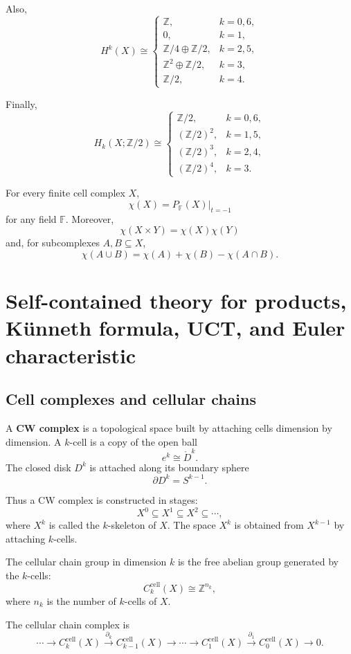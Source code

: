 \documentclass[12pt,a4paper]{article}
\theoremstyle{notespace}
\begin{document}
Also,
\[
\boxed{
	H^k(X)\cong
	\begin{cases}
		\mathbb Z, & k=0,6,\\[1mm]
		0, & k=1,\\[1mm]
		\mathbb Z/4\oplus \mathbb Z/2, & k=2,5,\\[1mm]
		\mathbb Z^2\oplus \mathbb Z/2, & k=3,\\[1mm]
		\mathbb Z/2, & k=4.
\end{cases}}
\]

Finally,
\[
\boxed{
	H_k(X;\mathbb Z/2)\cong
	\begin{cases}
		\mathbb Z/2, & k=0,6,\\[1mm]
		(\mathbb Z/2)^2, & k=1,5,\\[1mm]
		(\mathbb Z/2)^3, & k=2,4,\\[1mm]
		(\mathbb Z/2)^4, & k=3.
\end{cases}}
\]

For every finite cell complex \(X\),
\[
\boxed{
	\chi(X)=P_{\mathbb F}(X)\big|_{t=-1}}
\]
for any field \(\mathbb F\). Moreover,
\[
\boxed{
	\chi(X\times Y)=\chi(X)\chi(Y)}
\]
and, for subcomplexes \(A,B\subseteq X\),
\[
\boxed{
	\chi(A\cup B)=\chi(A)+\chi(B)-\chi(A\cap B).}
\]
\section{Self-contained theory for products, Künneth formula, UCT, and Euler characteristic}

\subsection{Cell complexes and cellular chains}

A \textbf{CW complex} is a topological space built by attaching cells dimension by dimension. A \(k\)-cell is a copy of the open ball
\[
e^k\cong \mathring{D}^k.
\]
The closed disk \(D^k\) is attached along its boundary sphere
\[
\partial D^k=S^{k-1}.
\]

Thus a CW complex is constructed in stages:
\[
X^0\subseteq X^1\subseteq X^2\subseteq \cdots,
\]
where \(X^k\) is called the \(k\)-skeleton of \(X\). The space \(X^k\) is obtained from \(X^{k-1}\) by attaching \(k\)-cells.

The cellular chain group in dimension \(k\) is the free abelian group generated by the \(k\)-cells:
\[
C_k^{\mathrm{cell}}(X)\cong \mathbb Z^{n_k},
\]
where \(n_k\) is the number of \(k\)-cells of \(X\).

The cellular chain complex is
\[
\cdots
\longrightarrow
C_k^{\mathrm{cell}}(X)
\xrightarrow{\partial_k}
C_{k-1}^{\mathrm{cell}}(X)
\longrightarrow
\cdots
\longrightarrow
C_1^{\mathrm{cell}}(X)
\xrightarrow{\partial_1}
C_0^{\mathrm{cell}}(X)
\longrightarrow 0.
\]
\end{document}
